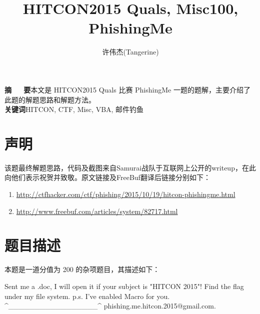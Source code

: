 \documentclass[a4paper,UTF8]{ctexart}
\title{HITCON2015 Quals, Misc100, PhishingMe}
\author{许伟杰(Tangerine)}
\affil{哈尔滨工业大学，计算机科学与技术学院，alentangerine@gmail.com}
\date{}
\begin{document}
\maketitle

\begin{center}
\parbox{0.9\textwidth}{
\textbf{摘~~~要}\quad 本文是 HITCON2015 Quals 比赛 PhishingMe 一题的题解，主要介绍了此题的解题思路和解题方法。\\
\textbf{关键词}\quad HITCON, CTF, Misc, VBA, 邮件钓鱼\\}
\end{center}


\section{声明}
该题最终解题思路，代码及截图来自Samurai战队于互联网上公开的writeup，在此向他们表示祝贺并致敬。原文链接及FreeBuf翻译后链接分别如下：

\begin{enumerate}
	\item \url{http://ctfhacker.com/ctf/phishing/2015/10/19/hitcon-phishingme.html}
	\item \url{http://www.freebuf.com/articles/system/82717.html}
\end{enumerate}

\section{题目描述}

本题是一道分值为 200 的杂项题目，其描述如下：\\

\begin{quizdesc}[label=Misc 200 PhishingMe]
Sent me a .doc, I will open it if your subject is "HITCON 2015"!
Find the flag under my file system. 
p.s. I've enabled Macro for you. ^_________________^
phishing.me.hitcon.2015@gmail.com.
\end{quizdesc}
\end{document}
